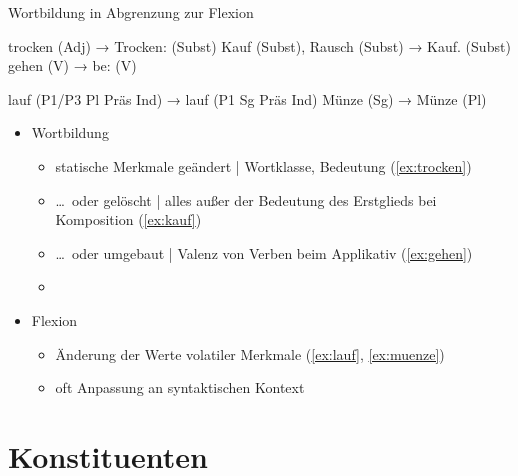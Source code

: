 \begin{frame}
  {Wortbildung in Abgrenzung zur Flexion}
  \pause
  \begin{exe}
    \ex
    \begin{xlist}
      \ex trocken (Adj) → \alert{Trocken}: (Subst)\label{ex:trocken}
      \ex Kauf (Subst), Rausch (Subst) → \alert{Kauf}. (Subst)\label{ex:kauf}
      \ex gehen (V) → \alert{be}: (V)\label{ex:gehen}
    \end{xlist}
    \pause
    \ex
    \begin{xlist}
      \ex \alert{lauf} (P1\slash P3 Pl Präs Ind) → \alert{lauf} (P1 Sg Präs Ind)\label{ex:lauf}
      \ex \alert{Münze} (Sg) → \alert{Münze} (Pl)\label{ex:muenze}
    \end{xlist}
  \end{exe}
  \pause
  \Halbzeile
  \begin{itemize}[<+->]
    \item Wortbildung
      \begin{itemize}[<+->]
        \item statische Merkmale geändert | Wortklasse, Bedeutung \alert{(\ref{ex:trocken})}
        \item \ldots\ oder gelöscht | alles außer der Bedeutung des Erstglieds bei Komposition \alert{(\ref{ex:kauf})}
        \item \ldots\ oder umgebaut | Valenz von Verben beim Applikativ \alert{(\ref{ex:gehen})}
        \item {}
      \end{itemize}
  \Halbzeile
    \item Flexion
      \begin{itemize}
        \item Änderung der Werte volatiler Merkmale \alert{(\ref{ex:lauf}, \ref{ex:muenze})}
        \item \alert{oft Anpassung an syntaktischen Kontext}
      \end{itemize}
  \end{itemize}
\end{frame}


\section{Konstituenten}


